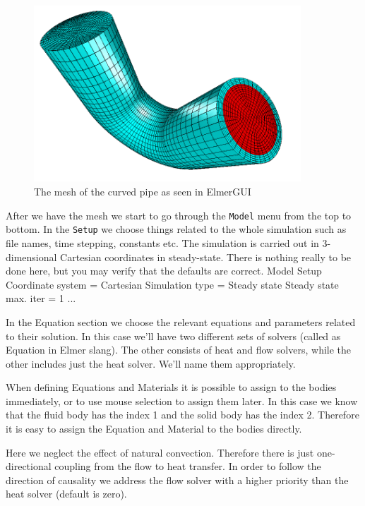 \begin{figure}[h]
\centering
\includegraphics[width=10cm]{curved_pipe_gui}
\caption{The mesh of the curved pipe as seen in ElmerGUI}\label{fg:curved_pipe_mesh}
\end{figure} 


After we have the mesh we start to go through the \texttt{Model} menu from the top to bottom. 
In the \texttt{Setup} we choose things related to the whole simulation such as file names, 
time stepping, constants etc.
The simulation is carried out in 3-dimensional Cartesian
coordinates in steady-state. There is nothing really to be done here, but you may verify that
the defaults are correct. 
\ttbegin
Model
  Setup 
    Coordinate system = Cartesian
    Simulation type = Steady state
    Steady state max. iter = 1
    ...
\ttend

In the Equation section we choose the relevant equations and parameters related to their solution. 
In this case we'll have two different sets of solvers (called as Equation in Elmer slang). 
The other consists of heat and flow solvers, while the 
other includes just the heat solver. We'll name them appropriately. 

When defining Equations and Materials it is possible to assign to the bodies immediately, or to use mouse
selection to assign them later. In this case we know that the fluid body has the index 1 and the 
solid body has the index 2. Therefore it is easy to assign the Equation and Material to the bodies directly. 

Here we neglect the effect of natural convection. Therefore there is just one-directional coupling from the 
flow to heat transfer. In order to follow the direction of causality we address the flow solver with a higher 
priority than the heat solver (default is zero). 	

